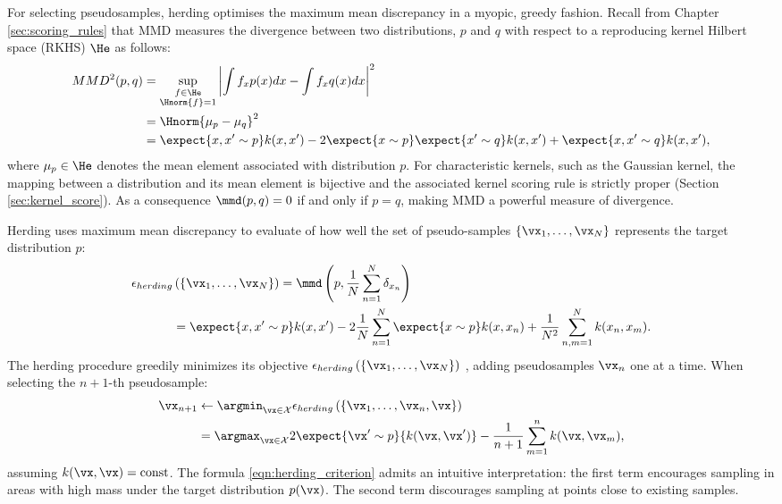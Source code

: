 For selecting pseudosamples, herding optimises the maximum mean discrepancy \citep[MMD;\ ][]{Sriperumbudur2008} in a myopic, greedy fashion. Recall from Chapter \ref{sec:scoring_rules} that MMD measures the divergence between two distributions, $p$ and $q$ with respect to a reproducing kernel Hilbert space (RKHS) $\He$ as follows:
%
\begin{align}
MMD^2(p,q) &= \sup_{\substack{f\in\He\\\Hnorm{f}=1}}\left\vert\int f_x p(x) dx - \int f_x q(x) dx\right\vert^2\\
	&= \Hnorm{\mu_{p} - \mu_{q}}^2\\
	&=  \expect{x,x'\sim p} k(x,x')	- 2 \expect{x\sim p}\expect{x'\sim q} k(x,x') + \expect{x,x'\sim q} k(x,x'),
\end{align}
%
where $\mu_{p}\in\He$ denotes the mean element associated with distribution $p$. For characteristic kernels, such as the Gaussian kernel, the mapping between a distribution and its mean element is bijective and the associated kernel scoring rule is strictly proper (Section \ref{sec:kernel_score}). As a consequence $\mmd(p,q)=0$ if and only if $p=q$, making MMD a powerful measure of divergence.

Herding uses maximum mean discrepancy to evaluate of how well the set of pseudo-samples $\{\vx_1,\ldots,\vx_{N}\}$ represents the target distribution $p$:
%
\begin{align}
	\epsilon_{herding}&\left(\{\vx_1,\ldots,\vx_{N}\}\right) = \mmd\left(p,\frac{1}{N}\sum_{n=1}^{N}\delta_{x_n}\right)\\
	&= \expect{x,x'\sim p} k(x,x') - 2 \frac{1}{N}\sum_{n=1}^{N} \expect{x\sim p}k(x,x_n)
		+ \frac{1}{N^2}\sum_{n,m=1}^{N} k(x_n,x_m).
\label{eq:mmd_assumption}
\end{align}
%
The herding procedure greedily minimizes its objective $\epsilon_{herding}\left(\{\vx_1,\ldots,\vx_{N}\}\right)$ , adding pseudosamples $\vx_n$ one at a time. When selecting the $n+1$-th pseudosample:
%
\begin{align}
\vx_{n+1} &\leftarrow \argmin_{\vx \in \mathcal{X}} \label{eqn:herding_criterion} \epsilon_{herding}\left(\{\vx_1,\ldots,\vx_{n},\vx\}\right)\\
	&= \argmax_{\vx \in \mathcal{X}} 2 \expect{\vx' \sim p}{k(\vx, \vx')} - \frac{1}{n+1}\sum_{m=1}^{n} k(\vx,\vx_m)\mbox{,}
\end{align}
%
assuming $k(\vx,\vx) = \mbox{const}$.
The formula \eqref{eqn:herding_criterion} admits an intuitive interpretation: the first term encourages sampling in areas with high mass under the target distribution $p(\vx)$. The second term discourages sampling at points close to existing samples. 

